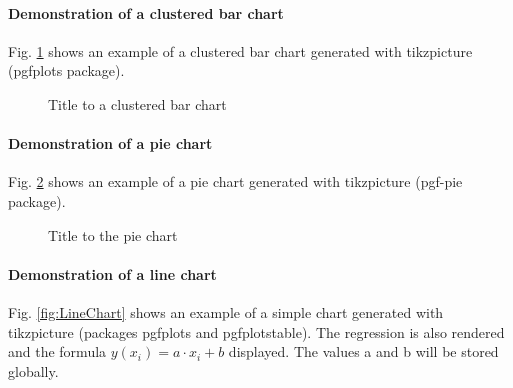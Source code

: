 \paragraph{Demonstration of a clustered bar chart}
Fig. \ref{fig:ClusteredBarChart} shows an example of a clustered bar chart generated with tikzpicture (pgfplots package).

\begin{figure}
	\centering
	\caption{\label{fig:ClusteredBarChart}Title to a clustered bar chart}
\end{figure}

\paragraph{Demonstration of a pie chart}
Fig. \ref{fig:PieChart} shows an example of a pie chart generated with tikzpicture (pgf-pie package).

\begin{figure}
	\centering
	\caption{\label{fig:PieChart}Title to the pie chart}
\end{figure}

\paragraph{Demonstration of a line chart}
Fig. \ref{fig:LineChart} shows an example of a simple chart generated with tikzpicture (packages pgfplots and pgfplotstable). 
The regression is also rendered and the formula $ y(x_i) = a \cdot x_i + b$ displayed. The values a and b will be stored globally.

